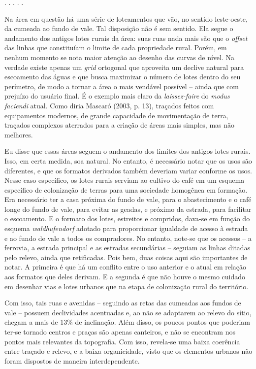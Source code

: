 \documentclass[12pt, a4paper]{book} %
\begin{document}
        \begin{center}
            . . . . .
        \end{center} 
        Na área em questão há uma série de loteamentos que vão, no sentido leste-oeste, da cumeada ao fundo de vale. Tal disposição não é sem sentido. Ela segue o andamento dos antigos lotes rurais da área: suas ruas nada mais são que o \textit{offset} das linhas que constituíam o limite de cada propriedade rural. Porém, em nenhum momento se nota maior atenção ao desenho das curvas de nível. Na verdade existe apenas um \textit{grid} ortogonal que aproveita um declive natural para escoamento das águas e que busca maximizar o número de lotes dentro do seu perímetro, de modo a tornar a área o mais vendável possível – ainda que com prejuízo do usuário final. É o exemplo mais claro da \textit{laissez-faire} do \textit{modus faciendi} atual. Como diria Mascaró (2003, p. 13), traçados feitos com equipamentos modernos, de grande capacidade de movimentação de terra, traçados complexos aterrados para a criação de áreas mais simples, mas não melhores.

        Eu disse que essas áreas seguem o andamento dos limites dos antigos lotes rurais. Isso, em certa medida, soa natural. No entanto, é necessário notar que os usos são diferentes, e que os formatos derivados também deveriam variar conforme os usos. Nesse caso específico, os lotes rurais serviam ao cultivo do café em um esquema específico de colonização de terras para uma sociedade homogênea em formação. Era necessário ter a casa próxima do fundo de vale, para o abastecimento e o café longe do fundo de vale, para evitar as geadas, e próximo da estrada, para facilitar o escoamento. E o formato dos lotes, estreitos e compridos, dava-se em função do esquema \textit{waldhufendorf} adotado para proporcionar igualdade de acesso à estrada e ao fundo de vale a todos os compradores. No entanto, note-se que os acessos – a ferrovia, a estrada principal e as estradas secundárias – seguiam as linhas ditadas pelo relevo, ainda que retificadas. Pois bem, duas coisas aqui são importantes de notar. A primeira é que há um conflito entre o uso anterior e o atual em relação aos formatos que deles derivam. E a segunda é que não houve o mesmo cuidado em desenhar vias e lotes urbanos que na etapa de colonização rural do território. 
        
        Com isso, tais ruas e avenidas – seguindo as retas das cumeadas aos fundos de vale – possuem declividades acentuadas e, ao não se adaptarem ao relevo do sítio, chegam a mais de 13\% de inclinação. Além disso, os poucos pontos que poderiam ter-se tornado centros e praças são apenas canteiros, e não se encontram nos pontos mais relevantes da topografia. Com isso, revela-se uma baixa coerência entre traçado e relevo, e a baixa organicidade, visto que os elementos urbanos não foram dispostos de maneira interdependente.
\end{document}

